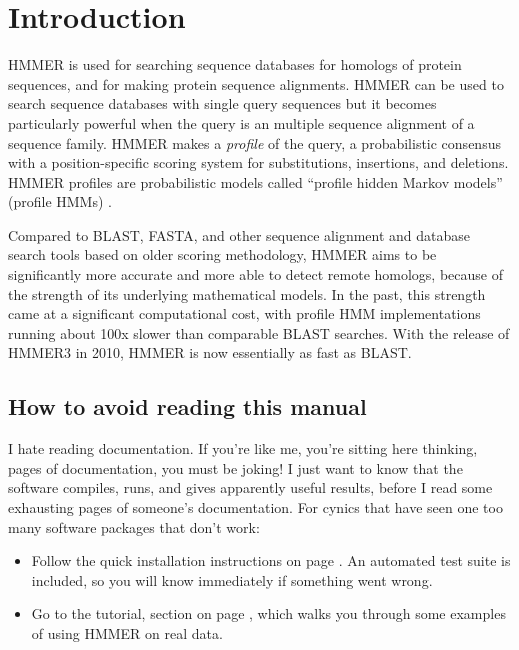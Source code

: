 \section{Introduction}
\setcounter{footnote}{0}

HMMER is used for searching sequence databases for homologs of protein
sequences, and for making protein sequence alignments. HMMER can be
used to search sequence databases with single query sequences but it
becomes particularly powerful when the query is an multiple sequence
alignment of a sequence family. HMMER makes a \emph{profile} of the
query, a probabilistic consensus with a position-specific scoring
system for substitutions, insertions, and deletions. HMMER profiles
are probabilistic models called ``profile hidden Markov models''
(profile HMMs) \citep{Krogh94,Eddy98,Durbin98}.

Compared to BLAST, FASTA, and other sequence alignment and database
search tools based on older scoring methodology, HMMER aims to be
significantly more accurate and more able to detect remote homologs,
because of the strength of its underlying mathematical models. In the
past, this strength came at a significant computational cost, with
profile HMM implementations running about 100x slower than comparable
BLAST searches. With the release of HMMER3 in 2010, HMMER is now
essentially as fast as BLAST.


\subsection{How to avoid reading this manual}

I hate reading documentation. If you're like me, you're sitting here
thinking, \pageref{manualend} pages of documentation, you must be
joking! I just want to know that the software compiles, runs, and
gives apparently useful results, before I read some 
\pageref{manualend} exhausting pages of someone's documentation. For
cynics that have seen one too many software packages that don't
work:

\begin{itemize}
\item Follow the quick installation instructions on page
      \pageref{section:installation}. An automated test suite
      is included, so you will know immediately if something
      went wrong.
\item Go to the tutorial, section on page
\pageref{section:tutorial}, which walks you through some examples of
using HMMER on real data.
\end{itemize}


